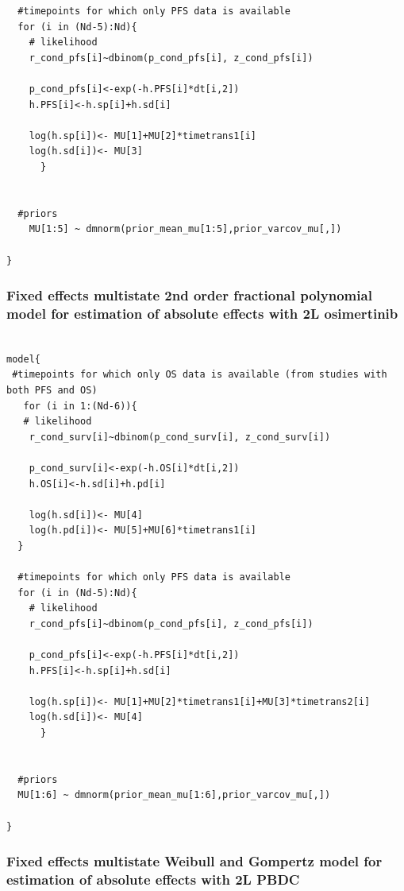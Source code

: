 \documentclass[11pt,final,fleqn]{article}\usepackage[]{graphicx}\usepackage[]{color}
\theoremstyle{plain}
\begin{document}
\begin{appendices}
\begin{verbatim}
  #timepoints for which only PFS data is available 
  for (i in (Nd-5):Nd){
    # likelihood
    r_cond_pfs[i]~dbinom(p_cond_pfs[i], z_cond_pfs[i]) 
    
    p_cond_pfs[i]<-exp(-h.PFS[i]*dt[i,2])
    h.PFS[i]<-h.sp[i]+h.sd[i]
    
    log(h.sp[i])<- MU[1]+MU[2]*timetrans1[i]
    log(h.sd[i])<- MU[3] 
      }
  
  
  #priors
    MU[1:5] ~ dmnorm(prior_mean_mu[1:5],prior_varcov_mu[,]) 
  
}

\end{verbatim}

\subsubsection{Fixed effects multistate 2nd order fractional polynomial model for estimation of absolute effects with 2L osimertinib} 
\begin{verbatim} 

model{
 #timepoints for which only OS data is available (from studies with both PFS and OS)
   for (i in 1:(Nd-6)){
   # likelihood
    r_cond_surv[i]~dbinom(p_cond_surv[i], z_cond_surv[i]) 
    
    p_cond_surv[i]<-exp(-h.OS[i]*dt[i,2])
    h.OS[i]<-h.sd[i]+h.pd[i]
    
    log(h.sd[i])<- MU[4] 
    log(h.pd[i])<- MU[5]+MU[6]*timetrans1[i]
  }
    
  #timepoints for which only PFS data is available 
  for (i in (Nd-5):Nd){
    # likelihood
    r_cond_pfs[i]~dbinom(p_cond_pfs[i], z_cond_pfs[i]) 
    
    p_cond_pfs[i]<-exp(-h.PFS[i]*dt[i,2])
    h.PFS[i]<-h.sp[i]+h.sd[i]
    
    log(h.sp[i])<- MU[1]+MU[2]*timetrans1[i]+MU[3]*timetrans2[i] 
    log(h.sd[i])<- MU[4] 
      }
  
 
  #priors
  MU[1:6] ~ dmnorm(prior_mean_mu[1:6],prior_varcov_mu[,]) 
  
}

\end{verbatim}

\subsubsection{Fixed effects multistate Weibull and Gompertz model for estimation of absolute effects with 2L PBDC} 
\begin{verbatim} 


\end{verbatim}
\end{appendices}
\end{document}
